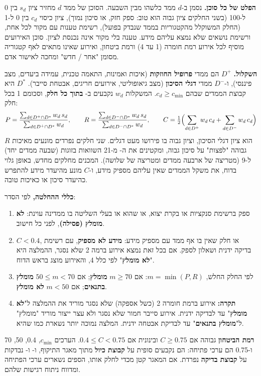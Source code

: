 \textbf{הפלט של כל סוכן.} נסמן ב-$d$ ממד כלשהו מבין השבעה. הסוכן של ממד $d$ מחזיר ציון $s_d$ בין 0 ל-100 (בשני החלקים ציון גבוה הוא טוב: ספק חזק, או סיכון נמוך), ציון כיסוי $c_d$ בין 0 ל-1 (החלק המשוקלל מהקטגוריות בממד שנבדק בפועל), רשימת טענות עם מקור לכל אחת, ורשימת נושאים שלא נמצא עליהם מידע. טענה בלי מקור אינה נכנסת לציון. סוכן האירועים מוסיף לכל אירוע רמת חומרה (1 עד 4) ורמת ביטחון, ואירוע שאינו מתאים לאף קטגוריה מסומן "אחר / חדש" ומחכה לאישור אדם.

\textbf{השקלול.} $D^{+}$ הם ממדי \textbf{פרופיל החוזקות} (איכות ואמינות, התאמה טכנית, עמידה ביעדים, מצב פיננסי), ו-$D^{-}$ ממדי \textbf{דגלי הסיכון} (מצב גיאופוליטי, אירועים חריגים, אבטחת סייבר). $D^{*}$ היא קבוצת הממדים שבהם $c_d \ge c_{\min}$. המשקלות $w_d$ נקבעים ב- \textbf{בתוך כל חלק}, וסכומם 1 בכל חלק:
\begin{equation}\label{eq:score}
P=\frac{\sum_{d\in D^{+}\cap D^{*}} w_d\, s_d}{\sum_{d\in D^{+}\cap D^{*}} w_d},\qquad
R=\frac{\sum_{d\in D^{-}\cap D^{*}} w_d\, s_d}{\sum_{d\in D^{-}\cap D^{*}} w_d},\qquad
C=\tfrac{1}{2}\Bigl(\sum_{d\in D^{+}} w_d\, c_d+\sum_{d\in D^{-}} w_d\, c_d\Bigr)
\end{equation}
$R$ הוא ציון דגלי הסיכון, וציון גבוה בו פירושו מעט דגלים. שני חלקים נפרדים מונעים מאיכות גבוהה "לפצות" על סיכון גבוה, ומקטינים את ה- מ-21 השוואות בזוגות (שבעה ממדים יחד) ל-9 (מטריצה של ארבעה ממדים ומטריצה של שלושה). המכנים מחלקים מחדש, באופן גלוי בדוח, את משקל הממדים שאין עליהם מספיק מידע, ו-$C$ מונע מהיעדר מידע להתפרש כהיעדר סיכון או כאיכות טובה.

\textbf{כללי ההחלטה,} לפי הסדר:
\begin{enumerate}
\item ספק ברשימת סנקציות או בקרת יצוא, או שהוא או בעלי השליטה בו ממדינה עוינת: \textbf{לא מומלץ (פסילה)}, לפני כל חישוב.
\item $C<0.4$, או חלק שאין בו אף ממד עם מספיק מידע: \textbf{מידע לא מספיק}, עם רשימת בדיקה ידנית ושאלון לספק. אם בכל זאת נמצא אירוע ברמה 2 שלא נסגר, ההמלצה היא "\textbf{לא מומלץ}" לפי כלל 4, והאירוע מוצג בראש הדוח.
\item לפי החלק החלש, $m=\min(P,R)$: אם $m\ge 70$ \textbf{מומלץ}; אם $50\le m<70$ \textbf{מומלץ בתנאים}; אם $m<50$ \textbf{לא מומלץ}.
\item \textbf{תקרה:} אירוע ברמת חומרה 2 (כשל אספקה) שלא נסגר מוריד את ההמלצה ל"\textbf{לא מומלץ}" עד לבדיקה ידנית. אירוע סייבר חמור שלא נסגר ולא עצר ייצור מוריד "מומלץ" ל"\textbf{מומלץ בתנאים}" עד לבדיקת אבטחה ידנית. המלצה נמוכה יותר נשארת כמו שהיא.
\end{enumerate}
\textbf{רמת הביטחון} גבוהה אם $C\ge 0.75$ ובינונית אם $0.4\le C<0.75$. הערכים $c_{\min}$, 0.4, 50, 70 ו-0.75 הם ערכי פתיחה: הם נקבעים סופית על \textbf{קבוצת כיול} מתוך מאגר התיקוף, ו- ו- נבדקות על \textbf{קבוצת בדיקה} נפרדת. אם המאגר קטן מכדי לחלק אותו, הספים נשארים ערכי הפתיחה ומדווח ניתוח רגישות שלהם.

